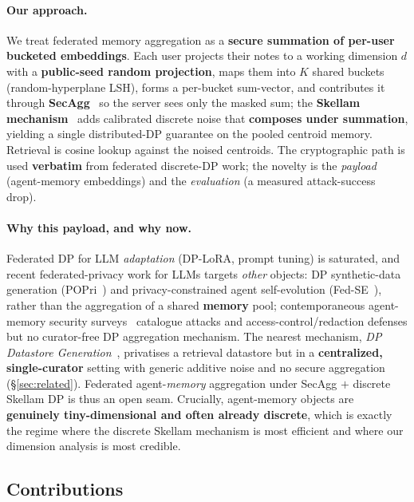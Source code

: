 \documentclass[pdflatex,sn-mathphys-num,12pt]{sn-jnl}
\theoremstyle{thmstyleone}%
\theoremstyle{thmstyletwo}%
\theoremstyle{thmstylethree}%
\newcommand{\secref}[1]{\S\ref{#1}}
\begin{document}
\paragraph{Our approach.}
We treat federated memory aggregation as a \textbf{secure summation of per-user
bucketed embeddings}. Each user projects their notes to a working dimension $d$
with a \textbf{public-seed random projection}, maps them into $K$ shared buckets
(random-hyperplane LSH), forms a per-bucket sum-vector, and contributes it
through \textbf{SecAgg}~\cite{bonawitz2017secagg} so the server sees only the
masked sum; the \textbf{Skellam mechanism}~\cite{agarwal2021skellam} adds
calibrated discrete noise that \textbf{composes under summation}, yielding a
single distributed-DP guarantee on the pooled centroid memory. Retrieval is
cosine lookup against the noised centroids. The cryptographic path is used
\textbf{verbatim} from federated discrete-DP work; the novelty is the
\emph{payload} (agent-memory embeddings) and the \emph{evaluation} (a measured
attack-success drop).

\paragraph{Why this payload, and why now.}
Federated DP for LLM \emph{adaptation} (DP-LoRA, prompt tuning) is saturated,
and recent federated-privacy work for LLMs targets \emph{other} objects: DP
synthetic-data generation (POPri~\cite{hou2025popri}) and privacy-constrained
agent self-evolution (Fed-SE~\cite{chen2025fedse}), rather than the
aggregation of a shared \textbf{memory} pool; contemporaneous agent-memory
security surveys~\cite{lin2026survey} catalogue attacks and
access-control/redaction defenses but no curator-free DP aggregation mechanism.
The nearest mechanism, \emph{DP Datastore
Generation}~\cite{abouelenein2026dpdatastore}, privatises a retrieval datastore
but in a \textbf{centralized, single-curator} setting with generic additive noise
and no secure aggregation (\secref{sec:related}). Federated agent-\emph{memory}
aggregation under SecAgg $+$ discrete Skellam DP is thus an open seam. Crucially,
agent-memory objects are \textbf{genuinely tiny-dimensional and often already
discrete}, which is exactly the regime where the discrete Skellam mechanism is
most efficient and where our dimension analysis is most credible.

\subsection*{Contributions}
\end{document}
